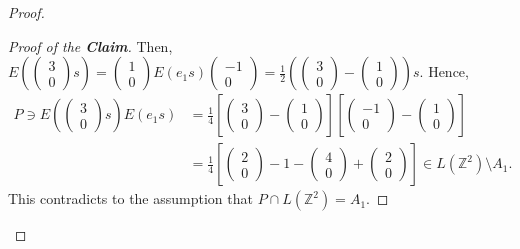 \documentclass[12pt]{amsart}
\theoremstyle{definition}
\theoremstyle{remark}
\begin{document}
\begin{proof}
\begin{proof}[Proof of the \textbf{Claim}]
Then, $E(\begin{pmatrix}
3\\
0
\end{pmatrix}s)=\begin{pmatrix}
1\\
0
\end{pmatrix}E(e_1s)\begin{pmatrix}
-1\\
0
\end{pmatrix}=\frac{1}{2}(\begin{pmatrix}
3\\
0
\end{pmatrix}-\begin{pmatrix}
1\\
0
\end{pmatrix})s$.
Hence, 
\begin{align*}
P\ni E(\begin{pmatrix}
3\\
0
\end{pmatrix}s)E(e_1s)&=\frac{1}{4}[\begin{pmatrix}
3\\
0
\end{pmatrix}-\begin{pmatrix}
1\\
0
\end{pmatrix}][\begin{pmatrix}
-1\\
0
\end{pmatrix}-\begin{pmatrix}
1\\
0
\end{pmatrix}]\\
&=\frac{1}{4}[\begin{pmatrix}
2\\
0
\end{pmatrix}-1-\begin{pmatrix}
4\\
0
\end{pmatrix}+\begin{pmatrix}
2\\
0
\end{pmatrix}]\in L(\mathbb{Z}^2)\setminus A_1.
\end{align*}
This contradicts to the assumption that $P\cap L(\mathbb{Z}^2)=A_1$.

















\end{proof}
\end{proof}
\end{document}
